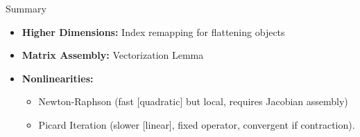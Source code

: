 \documentclass[aspectratio=169]{beamer}
\begin{document}
\begin{frame}{Summary}
    \begin{itemize}
        \item \textbf{Higher Dimensions:} Index remapping for flattening objects
        \item \textbf{Matrix Assembly:} Vectorization Lemma
        \item \textbf{Nonlinearities:} 
            \begin{itemize}
                \item Newton-Raphson (fast [quadratic] but local, requires Jacobian assembly) 
                \item Picard Iteration (slower [linear], fixed operator, convergent if contraction).
            \end{itemize}
    \end{itemize}
    \vspace{0.5cm}
\end{frame}

\begin{frame}
    \maketitle
\end{frame}
\end{document}
